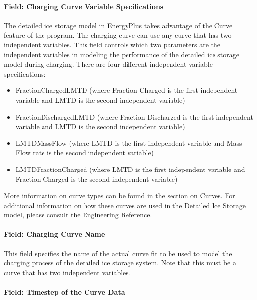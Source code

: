 \paragraph{Field: Charging Curve Variable Specifications}\label{field-charging-curve-variable-specifications}

The detailed ice storage model in EnergyPlus takes advantage of the Curve feature of the program.  The charging curve can use any curve that has two independent variables.  This field controls which two parameters are the independent variables in modeling the performance of the detailed ice storage model during charging. There are four different independent variable specifications:


\begin{itemize}
\item
FractionChargedLMTD (where Fraction Charged is the first independent variable and LMTD is the second independent variable)
\item 
FractionDischargedLMTD (where Fraction Discharged is the first independent variable and LMTD is the second independent variable)
\item
LMTDMassFlow (where LMTD is the first independent variable and Mass Flow rate is the second independent variable)
\item
LMTDFractionCharged (where LMTD is the first independent variable and Fraction Charged is the second independent variable)
\end{itemize}

More information on curve types can be found in the section on Curves.  For additional information on how these curves are used in the Detailed Ice Storage model, please consult the Engineering Reference.

\paragraph{Field: Charging Curve Name}\label{field-charging-curve-name}

This field specifies the name of the actual curve fit to be used to model the charging process of the detailed ice storage system. Note that this must be a curve that has two independent variables.

\paragraph{Field: Timestep of the Curve Data}\label{field-timestep-of-the-curve-data}

